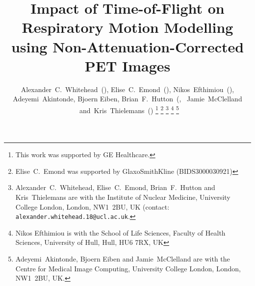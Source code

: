 \documentclass[9pt]{IEEEtran}
\begin{document}
%
\title{Impact of Time-of-Flight on Respiratory Motion Modelling using Non-Attenuation-Corrected PET Images}
%
%
%

\author{Alexander~C.~Whitehead~(),
        Elise~C.~Emond~(),
        Nikos~Efthimiou~(),
        Adeyemi~Akintonde,
        Bjoern Eiben,
        Brian~F.~Hutton~(,
        ~Jamie~McClelland
        ~and~Kris~Thielemans~()%
\thanks{This work was supported by GE Healthcare.}%
\thanks{Elise~C.~Emond was supported by GlaxoSmithKline (BIDS3000030921)}
\thanks{Alexander~C.~Whitehead, Elise~C.~Emond, Brian~F.~Hutton and Kris~Thielemans are with the Institute of Nuclear Medicine, University College London, London, NW1~2BU, UK (contact: \texttt{alexander.whitehead.18@ucl.ac.uk}.}%
\thanks{Nikos Efthimiou is with the School of Life Sciences, Faculty of Health Sciences, University of Hull, Hull, HU6 7RX, UK}%
\thanks{Adeyemi~Akintonde, Bjoern Eiben and Jamie~McClelland are with the Centre for Medical Image Computing, University College London, London, NW1~2BU, UK.}%
}

% 
%
\end{document}
